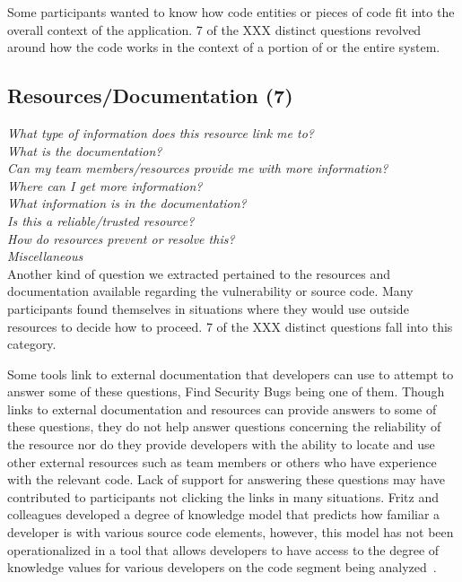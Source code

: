 \documentclass[conference]{IEEEtran}
\begin{document}
Some participants wanted to know how code entities or pieces of code fit into the overall context of the application. 7 of the XXX distinct questions revolved around how the code works in the context of a portion of or the entire system.



\noindent\subsection{\textbf{Resources/Documentation (7)}}

\noindent\emph{What type of information does this resource link me to?} \\
\emph{What is the documentation?} \\
\emph{Can my team members/resources provide me with more information?} \\
\emph{Where can I get more information?} \\
\emph{What information is in the documentation?} \\
\emph{Is this a reliable/trusted resource?} \\
\emph{How do resources prevent or resolve this?} \\
\emph{Miscellaneous} \\

Another kind of question we extracted pertained to the resources and documentation available regarding the vulnerability or source code. Many participants found themselves in situations where they would use outside resources to decide how to proceed. 7 of the XXX distinct questions fall into this category. 

Some tools link to external documentation that developers can use to attempt to answer some of these questions, Find Security Bugs being one of them. Though links to external documentation and resources can provide answers to  some of these questions, they do not help answer questions concerning the reliability of the resource nor do they provide developers with the ability to locate and use other external resources such as team members or others who have experience with the relevant code. Lack of support for answering these questions may have contributed to participants not clicking the links in many situations. Fritz and colleagues developed a degree of knowledge model that predicts how familiar a developer is with various source code elements, however, this model has not been operationalized in a tool that allows developers to have access to the degree of knowledge values for various developers on the code segment being analyzed~\cite{fritz2010degree}.
\end{document}
